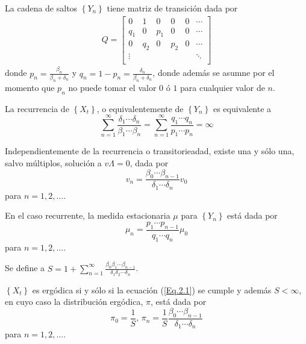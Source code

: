 La cadena de saltos $\left\{Y_{n}\right\}$ tiene matriz de transici\'on dada por
\begin{eqnarray*}
Q=\left[\begin{array}{cccccc}
0 & 1 & 0 &0 &0& \cdots\\
q_{1} & 0 & p_{1} & 0 & 0 &\cdots\\
0 & q_{2} & 0 & p_{2} & 0 &\cdots\\
\vdots & & & & & \ddots\\
\end{array}\right]
\end{eqnarray*}
donde $p_{n}=\frac{\beta_{n}}{\beta_{n}+\delta_{n}}$ y $q_{n}=1-p_{n}=\frac{\delta_{n}}{\beta_{n}+\delta_{n}}$, donde adem\'as se asumne por el momento que $p_{n}$ no puede tomar el valor $0$ \'o $1$ para cualquier valor de $n$.

\begin{Prop}\label{Prop.2.1}
La recurrencia de $\left\{X_{t}\right\}$, o equivalentemente de $\left\{Y_{n}\right\}$ es equivalente a
\begin{equation}\label{Eq.2.1}
\sum_{n=1}^{\infty}\frac{\delta_{1}\cdots\delta_{n}}{\beta_{1}\cdots\beta_{n}}=\sum_{n=1}^{\infty}\frac{q_{1}\cdots q_{n}}{p_{1}\cdots p_{n}}=\infty
\end{equation}
\end{Prop}

\begin{Lema}\label{Lema.2.2}
Independientemente de la recurrencia o transitorieadad, existe una y s\'olo una, salvo m\'ultiplos, soluci\'on a $v\Lambda=0$, dada por
\begin{equation}\label{Eq.2.2}
v_{n}=\frac{\beta_{0}\cdots\beta_{n-1}}{\delta_{1}\cdots\delta_{n}}v_{0}
\end{equation}
para $n=1,2,\ldots$.
\end{Lema}

\begin{Cor}\label{Cor.2.3}
En el caso recurrente, la medida estacionaria $\mu$ para $\left\{Y_{n}\right\}$ est\'a dada por
\begin{equation}\label{Eq.}
\mu_{n}=\frac{p_{1}\cdots p_{n-1}}{q_{1}\cdots q_{n}}\mu_{0}
\end{equation}
para $n=1,2,\ldots$.
\end{Cor}

Se define a $S=1+\sum_{n=1}^{\infty}\frac{\beta_{0}\beta_{1}\cdots\beta_{n-1}}{\delta_{1}\delta_{2}\cdots\delta_{n}}$.

\begin{Cor}\label{Cor.2.4}
$\left\{X_{t}\right\}$ es erg\'odica si y s\'olo si la ecuaci\'on (\ref{Eq.2.1}) se cumple y adem\'as $S<\infty$, en cuyo caso la distribuci\'on erg\'odica, $\pi$, est\'a dada por
\begin{equation}\label{Eq.2.4}
\pi_{0}=\frac{1}{S}\textrm{,     }\pi_{n}=\frac{1}{S}\frac{\beta_{0}\cdots\beta_{n-1}}{\delta_{1}\cdots\delta_{n}}
\end{equation}
para $n=1,2,\ldots$.
\end{Cor}





